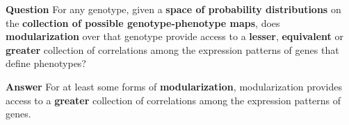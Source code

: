 \begin{frame}
\begin{block}{\textbf{Question}}
For any genotype, given a \textbf{space of probability distributions}
on the \textbf{collection of possible genotype-phenotype maps}, does \textbf{modularization} over that genotype provide access to a \textbf{lesser}, \textbf{equivalent} or \textbf{greater} collection of correlations among the expression patterns of genes that define phenotypes?
\end{block}
\begin{block}{\textbf{Answer}}
For at least some forms of \textbf{modularization}, modularization provides access to a \textbf{greater} collection of correlations among the expression patterns of genes.
\end{block}
\end{frame}

